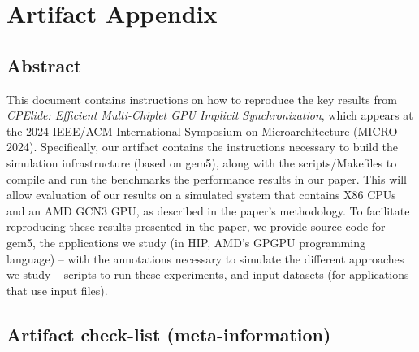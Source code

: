 \documentclass{sigplanconf}
\begin{document}


\appendix
\section{Artifact Appendix}
\label{sec:artifact}

\subsection{Abstract}
\label{subsec:artifact-abs}


This document contains instructions on how to reproduce the key results from \textit{CPElide: Efficient Multi-Chiplet GPU Implicit Synchronization}, which appears at the 2024 IEEE/ACM International Symposium on Microarchitecture (MICRO 2024).
Specifically, our artifact contains the instructions necessary to build the simulation infrastructure (based on gem5), along with the scripts/Makefiles to compile and run the benchmarks the performance results in our paper.
This will allow evaluation of our results on a simulated system that contains X86 CPUs and an AMD GCN3 GPU, as described in the paper's methodology.
To facilitate reproducing these results presented in the paper, we provide source code for gem5, the applications we study (in HIP, AMD's GPGPU programming language) -- with the annotations necessary to simulate the different approaches we study -- scripts to run these experiments, and input datasets (for applications that use input files).

\subsection{Artifact check-list (meta-information)}
\label{subsec:artifact-checklist}

\end{document}
